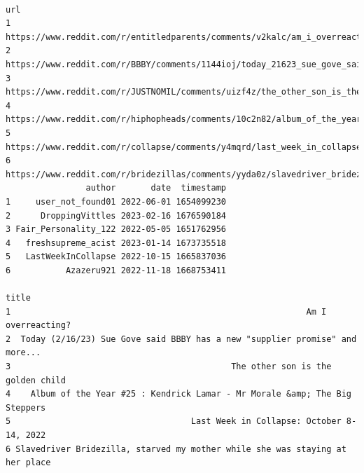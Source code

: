\documentclass[
  letterpaper,
  DIV=11,
  numbers=noendperiod]{scrreprt}
\begin{document}
\begin{verbatim}
                                                                                                       url
1                              https://www.reddit.com/r/entitledparents/comments/v2kalc/am_i_overreacting/
2        https://www.reddit.com/r/BBBY/comments/1144ioj/today_21623_sue_gove_said_bbby_has_a_new_supplier/
3                    https://www.reddit.com/r/JUSTNOMIL/comments/uizf4z/the_other_son_is_the_golden_child/
4 https://www.reddit.com/r/hiphopheads/comments/10c2n82/album_of_the_year_25_kendrick_lamar_mr_morale_the/
5                https://www.reddit.com/r/collapse/comments/y4mqrd/last_week_in_collapse_october_814_2022/
6     https://www.reddit.com/r/bridezillas/comments/yyda0z/slavedriver_bridezilla_starved_my_mother_while/
                author       date  timestamp
1     user_not_found01 2022-06-01 1654099230
2      DroppingVittles 2023-02-16 1676590184
3 Fair_Personality_122 2022-05-05 1651762956
4   freshsupreme_acist 2023-01-14 1673735518
5   LastWeekInCollapse 2022-10-15 1665837036
6           Azazeru921 2022-11-18 1668753411
                                                                         title
1                                                           Am I overreacting?
2  Today (2/16/23) Sue Gove said BBBY has a new "supplier promise" and more...
3                                            The other son is the golden child
4    Album of the Year #25 : Kendrick Lamar - Mr Morale &amp; The Big Steppers
5                                    Last Week in Collapse: October 8-14, 2022
6 Slavedriver Bridezilla, starved my mother while she was staying at her place

\end{verbatim}
\end{document}
